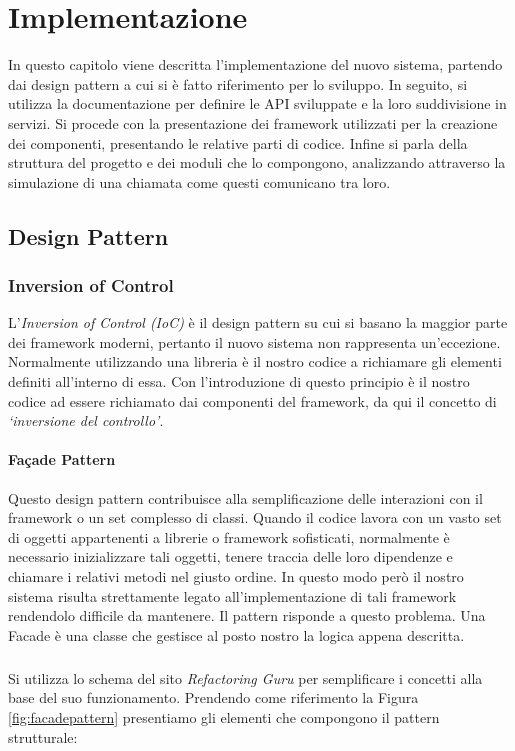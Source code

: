 \chapter{Implementazione}
In questo capitolo viene descritta l'implementazione del nuovo sistema, partendo dai design pattern a cui si è fatto riferimento per lo sviluppo. In seguito, si utilizza la documentazione per definire le API sviluppate e la loro suddivisione in servizi. Si procede con la presentazione dei framework utilizzati per la creazione dei componenti, presentando le relative parti di codice. Infine si parla della struttura del progetto e dei moduli che lo compongono, analizzando attraverso la simulazione di una chiamata come questi comunicano tra loro.
\label{chap:implementation}

\section{Design Pattern}
\subsection{Inversion of Control}
L'\emph{Inversion of Control (IoC)} è il design pattern su cui si basano la maggior parte dei framework moderni, pertanto il nuovo sistema non rappresenta un'eccezione. Normalmente utilizzando una libreria è il nostro codice a richiamare gli elementi definiti all'interno di essa. Con l'introduzione di questo principio è il nostro codice ad essere richiamato dai componenti del framework, da qui il concetto di \emph{`inversione del controllo'}.

\subsubsection{Façade Pattern}
Questo design pattern contribuisce alla semplificazione delle interazioni con il framework o un set complesso di classi. Quando il codice lavora con un vasto set di oggetti appartenenti a librerie o framework sofisticati, normalmente è necessario inizializzare tali oggetti, tenere traccia delle loro dipendenze e chiamare i relativi metodi nel giusto ordine. In questo modo però il nostro sistema risulta strettamente legato all’implementazione di tali framework rendendolo difficile da mantenere. Il pattern risponde a questo problema. Una Facade è una classe che gestisce al posto nostro la logica appena descritta.

\paragraph{}Si utilizza lo schema del sito \emph{Refactoring Guru} \cite{refactoring:facadepattern} per semplificare i concetti alla base del suo funzionamento. Prendendo come riferimento la Figura \ref{fig:facadepattern} presentiamo gli elementi che compongono il pattern strutturale:

